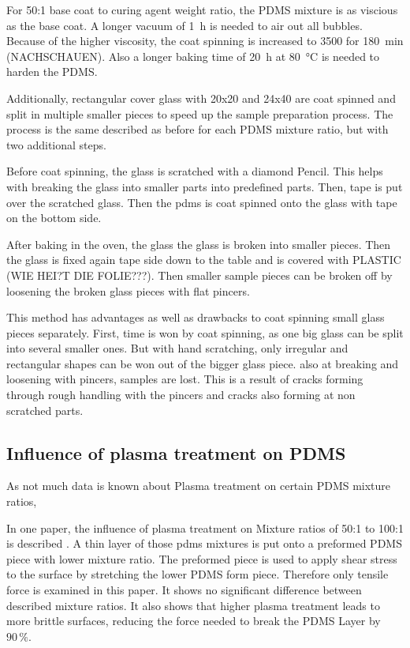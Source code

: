 For 50:1 base coat to curing agent weight ratio, the PDMS mixture is as viscious as the base coat. A longer vacuum of \SI{1}{\hour} is needed to air out all bubbles. Because of the higher viscosity, the coat spinning is increased to \SI{3500}{\rpm} for \SI{180}{\minute} (NACHSCHAUEN). Also a longer baking time of \SI{20}{\hour} at \SI{80}{\degreeCelsius} is needed to harden the PDMS. 

Additionally, rectangular cover glass with 20x20 and 24x40 are coat spinned and split in multiple smaller pieces to speed up the sample preparation process. The process is the same described as before for each PDMS mixture ratio, but with two additional steps.

Before coat spinning, the glass is scratched with a diamond Pencil. This helps with breaking the glass into smaller parts into predefined parts. Then, tape is put over the scratched glass. Then the pdms is coat spinned onto the glass with tape on the bottom side. 

After baking in the oven, the glass the glass is broken into smaller pieces. Then the glass is fixed again tape side down to the table and is covered with PLASTIC (WIE HEI?T DIE FOLIE???). Then smaller sample pieces can be broken off by loosening the broken glass pieces with flat pincers.

This method has advantages as well as drawbacks to coat spinning small glass pieces separately. First, time is won by coat spinning, as one big glass can be split into several smaller ones. But with hand scratching, only irregular and rectangular shapes can be won out of the bigger glass piece. also at breaking and loosening with pincers, samples are lost. This is a result of cracks forming through rough handling with the pincers and cracks also forming at non scratched parts.

\subsection{Influence of plasma treatment on PDMS}

As not much data is known about Plasma treatment on certain PDMS mixture ratios, 

In one paper, the influence of plasma treatment on Mixture ratios of 50:1 to 100:1 is described  \cite{Ohishi.2017}. A thin layer of those pdms mixtures is put onto a preformed PDMS piece with lower mixture ratio. The preformed piece is used to apply shear stress to the surface by stretching the lower PDMS form piece. Therefore only tensile force is examined in this paper. It shows no significant difference between described mixture ratios. It also shows that higher plasma treatment leads to more brittle surfaces, reducing the force needed to break the PDMS Layer by $90\,\%$.

